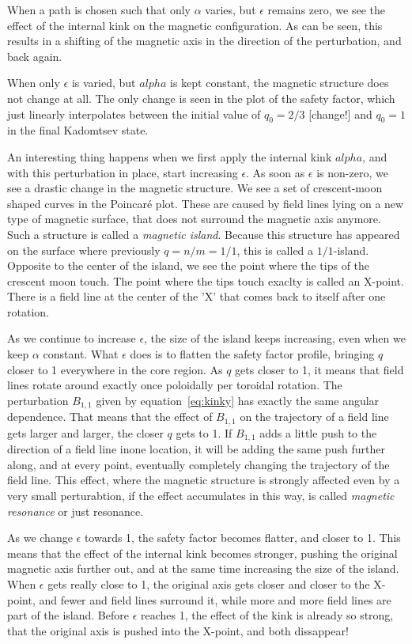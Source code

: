 \documentclass[%
superscriptaddress,
amsmath,amssymb,
aps,
pre,
floatfix,
]{revtex4-2}
\begin{document}
When a path is chosen such that only $\alpha$ varies, but $\epsilon$ remains zero, we see the effect of the internal kink on the magnetic configuration. 
As can be seen, this results in a shifting of the magnetic axis in the direction of the perturbation, and back again. 

When only $\epsilon$ is varied, but $alpha$ is kept constant, the magnetic structure does not change at all. 
The only change is seen in the plot of the safety factor, which just linearly interpolates between the initial value of $q_0=2/3$ [change!] and $q_0=1$ in the final Kadomtsev state. 

An interesting thing happens when we first apply the internal kink $alpha$, and with this perturbation in place, start increasing $\epsilon$. 
As soon as $\epsilon$ is non-zero, we see a drastic change in the magnetic structure. 
We see a set of crescent-moon shaped curves in the Poincar\'e plot. 
These are caused by field lines lying on a new type of magnetic surface, that does not surround the magnetic axis anymore. 
Such a structure is called a \emph{magnetic island}. 
Because this structure has appeared on the surface where previously $q=n/m=1/1$, this is called a $1/1$-island. 
Opposite to the center of the island, we see the point where the tips of the crescent moon touch. 
The point where the tips touch exaclty is called an X-point. 
There is a field line at the center of the 'X' that comes back to itself after one rotation. 

As we continue to increase  $\epsilon$, the size of the island keeps increasing, even when we keep $\alpha$ constant. 
What $\epsilon$ does is to flatten the safety factor profile, bringing $q$ closer to 1 everywhere in the core region.
As $q$ gets closer to 1, it means that field lines rotate around exactly once poloidally per toroidal rotation. 
The perturbation $B_{1,1}$ given by equation~\eqref{eq:kinky} has exactly the same angular dependence. 
That means that the effect of $B_{1,1}$ on the trajectory of a field line gets larger and larger, the closer $q$ gets to 1. 
If $B_{1,1}$ adds a little push to the direction of a field line inone location, it will be adding the same push further along, and at every point, eventually completely changing the trajectory of the field line. 
This effect, where the magnetic structure is strongly affected even by a very small perturabtion, if the effect accumulates in this way, is called \emph{magnetic resonance} or just resonance. 

As we change $\epsilon$ towards 1, the safety factor becomes flatter, and closer to 1. 
This means that the effect of the internal kink becomes stronger, pushing the original magnetic axis further out, and at the same time increasing the size of the island.
When $\epsilon$ gets really close to 1, the original axis gets closer and closer to the X-point, and fewer and field lines surround it, while more and more field lines are part of the island. 
Before $\epsilon$ reaches 1, the effect of the kink is already so strong, that the original axis is pushed into the X-point, and both dissappear!
\end{document}
